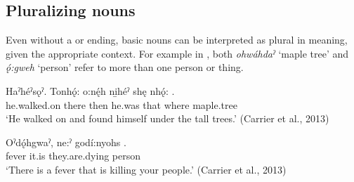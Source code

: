 \subsection{Pluralizing nouns} \label{Pluralizing nouns}
Even without a  {\pluralizer} or  {\pluralizer} ending, basic nouns can be interpreted as plural in meaning, given the appropriate context. For example in , both \textit{ohwáhdaˀ} ‘maple tree’ and \textit{ǫ́:gweh} ‘person’ refer to more than one person or thing.

\ea\label{ex:pluralizingnounex}
 \gll Haˀhéˀsǫˀ. Tonhǫ́: o:nę́h ni̱héˀ shę nhǫ́: . \\
he.walked.on there then he.was that where maple.tree \\
\glt ‘He walked on and found himself under the tall trees.’ (Carrier et al., 2013)
\z

\ea\label{ex:pluralizingnounex2}
 \gll Oˀdǫ́hgwaˀ, ne:ˀ godí:nyohs . \\
fever  it.is they.are.dying person\\
\glt ‘There is a fever that is killing your people.’ (Carrier et al., 2013)
\z

